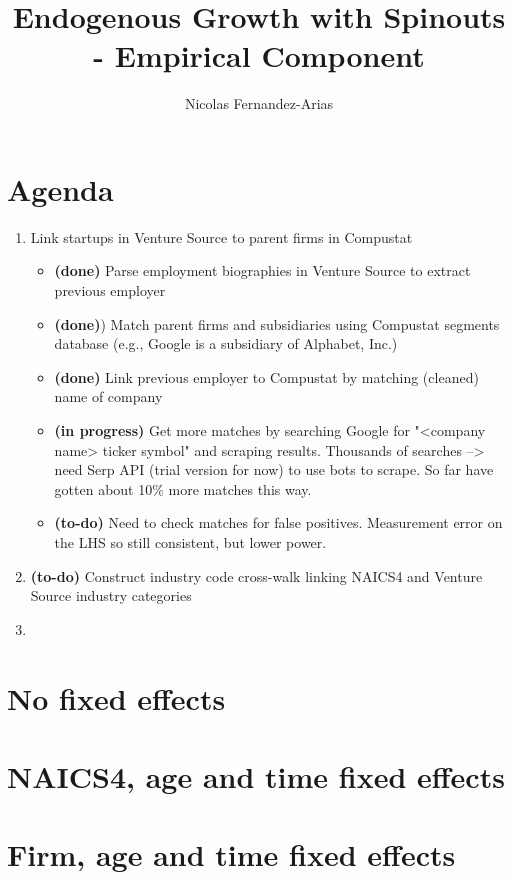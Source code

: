 \documentclass[12pt,english]{article}
\theoremstyle{remark}
\begin{document}
	
	
	
\title{Endogenous Growth with Spinouts - Empirical Component}
\author{Nicolas Fernandez-Arias}
\maketitle

\section*{Agenda}

\begin{enumerate}
	\item Link startups in Venture Source to parent firms in Compustat
	\begin{itemize}
		\item \textbf{(done)} Parse employment biographies in Venture Source to extract previous employer 
		\item \textbf{(done)}) Match parent firms and subsidiaries using Compustat segments database (e.g., Google is a subsidiary of Alphabet, Inc.) 
		\item \textbf{(done)} Link previous employer to Compustat by matching (cleaned) name of company 
		\item \textbf{(in progress)} Get more matches by searching Google for "<company name> ticker symbol" and scraping results. Thousands of searches --> need Serp API (trial version for now) to use bots to scrape. So far have gotten about 10\% more matches this way. 
		\item \textbf{(to-do)} Need to check matches for false positives. Measurement error on the LHS so still consistent, but lower power. 
	\end{itemize}
	
	\item \textbf{(to-do)} Construct industry code cross-walk linking NAICS4 and Venture Source industry categories
	\item 
\end{enumerate}

\section*{No fixed effects}



\section*{NAICS4, age and time fixed effects}



\section*{Firm, age and time fixed effects}


\end{document}
